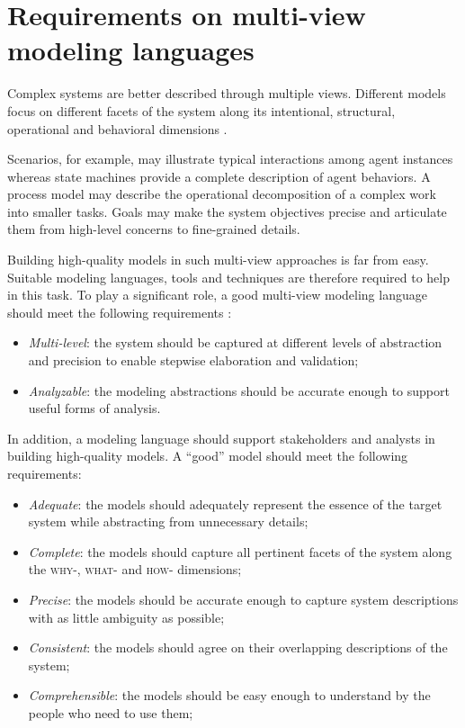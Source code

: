 \section{Requirements on multi-view modeling languages\label{section:intro-requirements}}

Complex systems are better described through multiple views. Different models focus on different facets of the system along its intentional, structural, operational and behavioral dimensions \cite{VanLamsweerde:2009}. 

Scenarios, for example, may illustrate typical interactions among agent instances whereas state machines provide a complete description of agent behaviors. A process model may describe the operational decomposition of a complex work into smaller tasks. Goals may make the system objectives precise and articulate them from high-level concerns to fine-grained details.

Building high-quality models in such multi-view approaches is far from easy. Suitable modeling languages, tools and techniques are therefore required to help in this task. To play a significant role, a good multi-view modeling language should meet the following requirements \cite{VanLamsweerde:2009}:

\begin{itemize}
\item \emph{Multi-level}: the system should be captured at different levels of abstraction and precision to enable stepwise elaboration and validation;
\item \emph{Analyzable}: the modeling abstractions should be accurate enough to support useful forms of analysis.
\end{itemize}

In addition, a modeling language should support stakeholders and analysts in building high-quality models. A ``good'' model should meet the following requirements:

\begin{itemize}
\item \emph{Adequate}: the models should adequately represent the essence of the target system while abstracting from unnecessary details;
\item \emph{Complete}: the models should capture all pertinent facets of the system along the \textsc{why-}, \textsc{what-} and \textsc{how-} dimensions;
\item \emph{Precise}: the models should be accurate enough to capture system descriptions with as little ambiguity as possible;
\item \emph{Consistent}: the models should agree on their overlapping descriptions of the system;
\item \emph{Comprehensible}: the models should be easy enough to understand by the people who need to use them;
\end{itemize}

